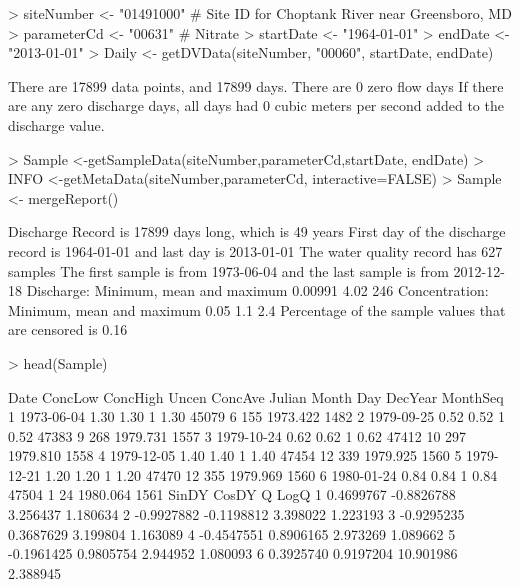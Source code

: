 \documentclass[a4paper,11pt]{article}
\begin{document}
\begin{Schunk}
\begin{Sinput}
> siteNumber <- "01491000" # Site ID for Choptank River near Greensboro, MD
> parameterCd <- "00631"  # Nitrate
> startDate <- "1964-01-01"
> endDate <- "2013-01-01"
> Daily <- getDVData(siteNumber, "00060", startDate, endDate)
\end{Sinput}
\begin{Soutput}
There are  17899 data points, and  17899 days.
There are  0 zero flow days
If there are any zero discharge days, all days had 0 cubic meters per second added to the discharge value.
\end{Soutput}
\begin{Sinput}
> Sample <-getSampleData(siteNumber,parameterCd,startDate, endDate)
> INFO <-getMetaData(siteNumber,parameterCd, interactive=FALSE)
> Sample <- mergeReport()
\end{Sinput}
\begin{Soutput}
 Discharge Record is 17899 days long, which is 49 years
 First day of the discharge record is 1964-01-01 and last day is 2013-01-01
 The water quality record has 627 samples
 The first sample is from 1973-06-04 and the last sample is from 2012-12-18
 Discharge: Minimum, mean and maximum 0.00991 4.02 246
 Concentration: Minimum, mean and maximum 0.05 1.1 2.4
 Percentage of the sample values that are censored is 0.16 %
\end{Soutput}
\begin{Sinput}
> head(Sample)
\end{Sinput}
\begin{Soutput}
        Date ConcLow ConcHigh Uncen ConcAve Julian Month Day  DecYear MonthSeq
1 1973-06-04    1.30     1.30     1    1.30  45079     6 155 1973.422     1482
2 1979-09-25    0.52     0.52     1    0.52  47383     9 268 1979.731     1557
3 1979-10-24    0.62     0.62     1    0.62  47412    10 297 1979.810     1558
4 1979-12-05    1.40     1.40     1    1.40  47454    12 339 1979.925     1560
5 1979-12-21    1.20     1.20     1    1.20  47470    12 355 1979.969     1560
6 1980-01-24    0.84     0.84     1    0.84  47504     1  24 1980.064     1561
       SinDY      CosDY         Q     LogQ
1  0.4699767 -0.8826788  3.256437 1.180634
2 -0.9927882 -0.1198812  3.398022 1.223193
3 -0.9295235  0.3687629  3.199804 1.163089
4 -0.4547551  0.8906165  2.973269 1.089662
5 -0.1961425  0.9805754  2.944952 1.080093
6  0.3925740  0.9197204 10.901986 2.388945
\end{Soutput}
\end{Schunk}
\end{document}
